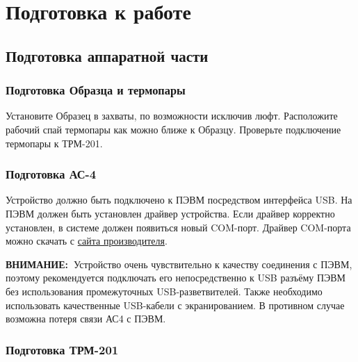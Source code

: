 \documentclass[12pt, a4paper, twocolumn]{report}
\newcommand{\IMPORTANT}{{\bf ВНИМАНИЕ:~}}
\begin{document}
\chapter{Подготовка к работе}

\section{Подготовка аппаратной части}

\subsection{Подготовка Образца и термопары}

Установите Образец в захваты, по возможности исключив люфт. Расположите рабочий спай термопары как можно ближе к Образцу. Проверьте подключение термопары к ТРМ-201.

\subsection{Подготовка АС-4}

Устройство должно быть подключено к ПЭВМ посредством интерфейса USB. На ПЭВМ должен быть установлен драйвер устройства. Если драйвер корректно установлен, в системе должен появиться новый COM-порт. Драйвер COM-порта можно скачать с \href{http://www.owen.ru/catalog/avtomaticheskij_preobrazovatel_interfejsov_usb_rs_485_owen_as4/opisanie}{сайта производителя}.

\IMPORTANT Устройство очень чувствительно к качеству соединения с ПЭВМ, поэтому рекомендуется подключать его непосредственно к USB разъёму ПЭВМ без использования промежуточных USB-разветвителей. Также необходимо использовать качественные USB-кабели с экранированием. В противном случае возможна потеря связи АС4 с ПЭВМ.

\subsection{Подготовка ТРМ-201}
\end{document}
